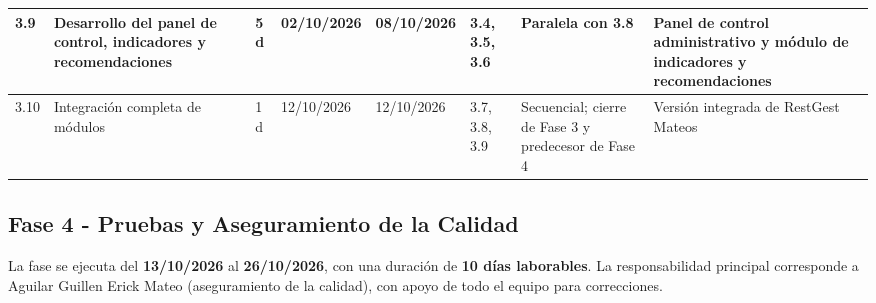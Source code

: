 \documentclass[12pt,a4paper]{article}
\begin{document}
\begin{landscape}
\begin{center}
\begin{tabularx}{\linewidth}{|p{0.85cm}|p{4.0cm}|p{0.75cm}|p{1.45cm}|p{1.45cm}|p{1.4cm}|p{4.0cm}|X|}
3.9 & Desarrollo del panel de control, indicadores y recomendaciones & 5 d & 02/10/2026 & 08/10/2026 & 3.4, 3.5, 3.6 & Paralela con 3.8 & Panel de control administrativo y módulo de indicadores y recomendaciones \\ \hline
3.10 & Integración completa de módulos & 1 d & 12/10/2026 & 12/10/2026 & 3.7, 3.8, 3.9 & Secuencial; cierre de Fase 3 y predecesor de Fase 4 & Versión integrada de RestGest Mateos \\ \hline
\end{tabularx}
\end{center}
\end{landscape}




\begin{landscape}
\subsection{Fase 4 - Pruebas y Aseguramiento de la Calidad}

La fase se ejecuta del \textbf{13/10/2026} al \textbf{26/10/2026}, con una duración de \textbf{10 días laborables}. 
La responsabilidad principal corresponde a Aguilar Guillen Erick Mateo (aseguramiento de la calidad), con apoyo de todo el equipo para correcciones.


\end{landscape}
\end{document}

